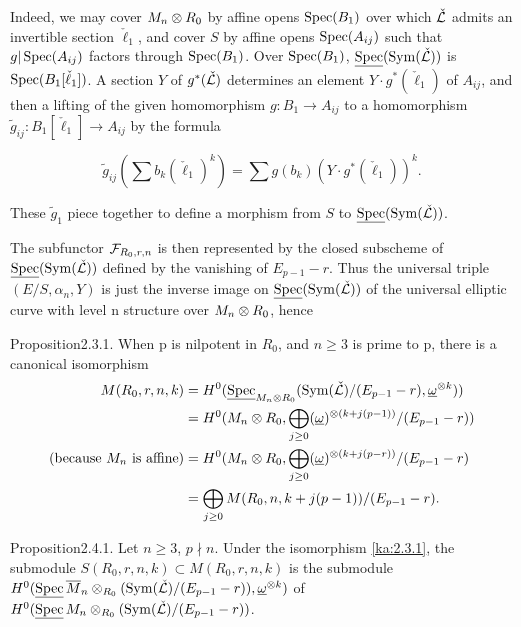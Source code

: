 Indeed, we may cover $M_n\otimes R_0$ by affine opens $\operatorname{Spec}(B_1)$ over which
$\check{\mathcal{L}}$ admits an invertible section $\check{\ell}_1$, and cover $S$ by
affine opens $\operatorname{Spec}(A_{ij})$ such that $g|\operatorname{Spec}(A_{ij})$ factors through
$\operatorname{Spec}(B_1)$. Over $\operatorname{Spec}(B_1)$, $\underline{\operatorname{Spec}}(\operatorname{Sym}(\check{\mathcal{L}}))$ is
$\operatorname{Spec}(B_1[\check{\ell}_1])$. A section $Y$ of $g^*(\check{\mathcal{L}})$ determines an
element $Y\cdot g^*(\check{\ell}_1)$ of $A_{ij}$, and then a lifting of the
given homomorphism $g\colon B_1\to A_{ij}$ to a homomorphism
$\tilde{g}_{ij}\colon B_1[\check{\ell}_1]\to A_{ij}$ by the formula

\[
\tilde{g}_{ij}(\sum b_k(\check{\ell}_1)^k) =
\sum g(b_k)(Y\cdot g^*(\check{\ell}_1))^k.
\]

These $\tilde{g}_1$ piece together to define a morphism from $S$ to
$\underline{\operatorname{Spec}}(\operatorname{Sym}(\check{\mathcal{L}}))$.

The subfunctor $\mathcal{F}_{R_0,r,n}$ is then represented by the closed subscheme of
$\underline{\operatorname{Spec}}(\operatorname{Sym}(\check{\mathcal{L}}))$ defined by the vanishing of $E_{p-1}-r$.
Thus the universal triple $(E/S,\alpha_n,Y)$ is just the inverse image on
$\underline{\operatorname{Spec}}(\operatorname{Sym}(\check{\mathcal{L}}))$ of the universal elliptic curve with
level n structure over $M_n\otimes R_0$, hence

\begin{kathm}{Proposition}{2.3.1.}
When p is nilpotent in $R_0$, and $n\geq 3$ is prime to p, there is a canonical
isomorphism
\[
\begin{aligned}
M(R_0,r,n,k) &=
H^0(\underline{\operatorname{Spec}}_{M_n\otimes R_0}(\operatorname{Sym}(\check{\mathcal{L}})/(E_{p-1}-r),
\underline{\omega}^{\otimes k})) \\
&= H^0(M_n\otimes R_0,\bigoplus_{j\geq 0}
(\underline{\omega})^{\otimes(k+j(p-1))}/(E_{p-1}-r)) \\
\text{(because } M_n \text{ is affine)} &= H^0(M_n\otimes R_0,\bigoplus_{j\geq 0}
(\underline{\omega})^{\otimes(k+j(p-r))}/(E_{p-1}-r) \\
&= \bigoplus_{j\geq 0} M(R_0,n,k+j(p-1))/(E_{p-1}-r).
\end{aligned}
\]
\end{kathm}


\begin{kathm}{Proposition}{2.4.1.}
Let $n\geq 3$, $p\nmid n$. Under the isomorphism \eqref{ka:2.3.1}, the submodule
$S(R_0,r,n,k)\subset M(R_0,r,n,k)$ is the submodule
$H^0(\underline{\operatorname{Spec}}\,\overline{M}_n\otimes_{R_0}
(\operatorname{Sym}(\check{\mathcal{L}})/(E_{p-1}-r)),\underline{\omega}^{\otimes k})$ of
$H^0(\underline{\operatorname{Spec}}\,M_n\otimes_{R_0}
(\operatorname{Sym}(\check{\mathcal{L}})/(E_{p-1}-r))$.
\end{kathm}

